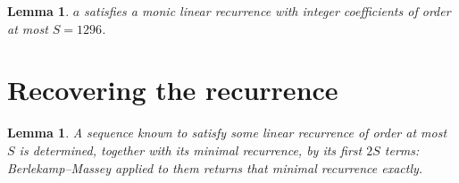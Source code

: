 \documentclass[11pt,a4paper]{article}
\theoremstyle{plain}
\newtheorem{lemma}[theorem]{Lemma}
\theoremstyle{definition}
\begin{document}
\begin{lemma}\label{lem:cf}
$a$ satisfies a monic linear recurrence with integer coefficients of order at most $S=1296$.
\end{lemma}

\section{Recovering the recurrence}

\begin{lemma}\label{lem:bm}
A sequence known to satisfy some linear recurrence of order at most $S$ is determined, together
with its minimal recurrence, by its first $2S$ terms: Berlekamp--Massey applied to them returns
that minimal recurrence exactly.
\end{lemma}
\end{document}
